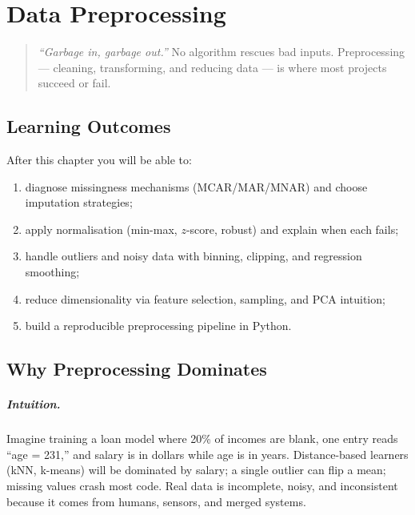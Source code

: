 \chapter{Data Preprocessing}
\label{ch:preprocessing}

\begin{quote}
\emph{``Garbage in, garbage out.''} No algorithm rescues bad inputs. Preprocessing --- cleaning, transforming, and reducing data --- is where most projects succeed or fail.
\end{quote}

\noindent{}
\vspace{0.4em}

\section*{Learning Outcomes}
After this chapter you will be able to:
\begin{enumerate}[label=(L\arabic*)]
    \item diagnose missingness mechanisms (MCAR/MAR/MNAR) and choose imputation strategies;
    \item apply normalisation (min-max, $z$-score, robust) and explain when each fails;
    \item handle outliers and noisy data with binning, clipping, and regression smoothing;
    \item reduce dimensionality via feature selection, sampling, and PCA intuition;
    \item build a reproducible preprocessing pipeline in Python.
\end{enumerate}

\section{Why Preprocessing Dominates}
\label{sec:why-preprocess}
\paragraph{Intuition.} Imagine training a loan model where 20\% of incomes are blank, one entry reads ``age = 231,'' and salary is in dollars while age is in years. Distance-based learners (kNN, k-means) will be dominated by salary; a single outlier can flip a mean; missing values crash most code. Real data is incomplete, noisy, and inconsistent because it comes from humans, sensors, and merged systems.

